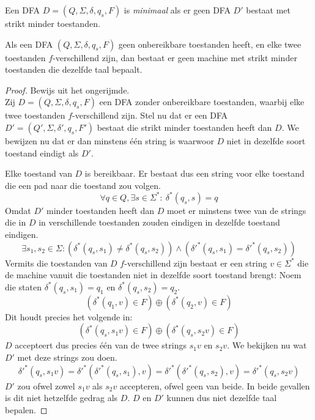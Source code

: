 \documentclass[main.tex]{subfiles}
\begin{document}
\begin{de}
  Een DFA $D = (Q,\Sigma,\delta,q_{s},F)$ is \emph{minimaal} als er geen DFA $D'$ bestaat met strikt minder toestanden.
\end{de}

\begin{st}
  Als een DFA $(Q,\Sigma,\delta,q_{s},F)$ geen onbereikbare toestanden heeft, en elke twee toestanden $f$-verschillend zijn, dan bestaat er geen machine met strikt minder toestanden die dezelfde taal bepaalt.

  \begin{proof}
    Bewijs uit het ongerijmde.\\
    Zij $D = (Q,\Sigma,\delta,q_{s},F)$ een DFA zonder onbereikbare toestanden, waarbij elke twee toestanden $f$-verschillend zijn.
    Stel nu dat er een DFA $D' = (Q',\Sigma,\delta',q_{s},F')$ bestaat die strikt minder toestanden heeft dan $D$. We bewijzen nu dat er dan minstens \'e\'en string is waarwoor $D$ niet in dezelfde soort toestand eindigt als $D'$.
    
    Elke toestand van $D$ is bereikbaar.
    Er bestaat dus een string voor elke toestand die een pad naar die toestand zou volgen.
    \[ \forall q\in Q, \exists s\in \Sigma^{*}:\ \delta^{*}(q_{s},s) = q \]
    Omdat $D'$ minder toestanden heeft dan $D$ moet er minstens twee van de strings die in $D$ in verschillende toestanden zouden eindigen in dezelfde toestand eindigen.
    \[ \exists s_{1},s_{2} \in \Sigma: (\delta^{*}(q_{s},s_{1}) \neq \delta^{*}(q_{s},s_{2})) \wedge (\delta'^{*}(q_{s},s_{1}) = \delta'^{*}(q_{s},s_{2})) \]
    Vermits die toestanden van $D$ $f$-verschillend zijn bestaat er een string $v\in \Sigma^{*}$ die de machine vanuit die toestanden niet in dezelfde soort toestand brengt:
    Noem die staten $\delta^{*}(q_{s},s_{1}) = q_{1}$ en $\delta^{*}(q_{s},s_{2}) = q_{2}$.
    \[ (\delta^{*}(q_{1},v) \in F) \oplus (\delta^{*}(q_{2},v) \in F) \]
    Dit houdt precies het volgende in:
    \[ (\delta^{*}(q_{s},s_{1}v) \in F) \oplus (\delta^{*}(q_{s},s_{2}v) \in F) \]
    $D$ accepteert dus precies \'e\'en van de twee strings $s_{1}v$ en $s_{2}v$.
    We bekijken nu wat $D'$ met deze strings zou doen.
    \[ \delta'^{*}(q_{s},s_{1}v) = \delta'^{*}(\delta'^{*}(q_{s},s_{1}),v) = \delta'^{*}(\delta'^{*}(q_{s},s_{2}),v) = \delta'^{*}(q_{s},s_{2}v) \]
    $D'$ zou ofwel zowel $s_{1}v$ als $s_{2}v$ accepteren, ofwel geen van beide.
    In beide gevallen is dit niet hetzelfde gedrag als $D$.
    $D$ en $D'$ kunnen dus niet dezelfde taal bepalen.
  \end{proof}
\end{st}
\end{document}
